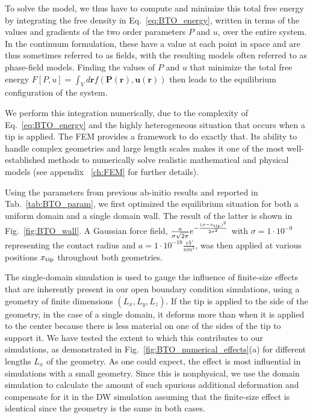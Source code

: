 To solve the model, we thus have to compute and minimize this total free energy by integrating the free density in Eq.~\eqref{eq:BTO_energy}, written in terms of the values and gradients of the two order parameters $P$ and $u$, over the entire system.
In the continuum formulation, these have a value at each point in space and are thus sometimes referred to as fields, with the resulting models often referred to as phase-field models.
Finding the values of $P$ and $u$ that minimize the total free energy $F[P,u]=\int_V d\bm{r} f(\bm{P}(\bm{r}),\bm{u}(\bm{r}))$ then leads to the equilibrium configuration of the system.

We perform this integration numerically, due to the complexity of Eq.~\eqref{eq:BTO_energy} and the highly heterogeneous situation that occurs when a tip is applied.
The \gls{FEM} provides a framework to do exactly that.
Its ability to handle complex geometries and large length scales makes it one of the most well-established methods to numerically solve realistic mathematical and physical models (see appendix ~\ref{ch:FEM} for further details).

Using the parameters from previous ab-initio results \cite{Marton2010} and reported in Tab.~\ref{tab:BTO_param}, we first optimized the equilibrium situation for both a uniform domain and a single domain wall. The result of the latter is shown in Fig.~\ref{fig:BTO_wall}.
A Gaussian force field, $\frac{a}{\sigma \sqrt{2\pi}}e^{-\frac{(x-x_{\rm tip})^2}{2\sigma^2}}$ with $\sigma = 1 \cdot 10^{-9}$ representing the contact radius and $a = 1 \cdot 10^{-18} \frac{eV}{nm^3}$, was then applied at various positions $x_{\rm tip}$ throughout both geometries.

The single-domain simulation is used to gauge the influence of finite-size effects that are inherently present in our open boundary condition simulations, using a geometry of finite dimensions $(L_x, L_y, L_z)$.
If the tip is applied to the side of the geometry, in the case of a single domain, it deforms more than when it is applied to the center because there is less material on one of the sides of the tip to support it.
We have tested the extent to which this contributes to our simulations, as demonstrated in Fig.~\ref{fig:BTO_numerical_effects}(a) for different lengths $L_x$ of the geometry. As one could expect, the effect is most influential in simulations with a small geometry.
Since this is nonphysical, we use the domain simulation to calculate the amount of such spurious additional deformation and compensate for it in the \gls{DW} simulation assuming that the finite-size effect is identical since the geometry is the same in both cases.

